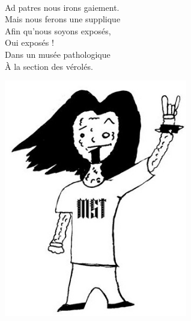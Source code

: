 \\Ad patres nous irons gaiement.
\\Mais nous ferons une supplique
\\Afin qu'nous soyons exposés,
\\Oui exposés !
\\Dans un musée pathologique
\\À la section des vérolés. ~~~~~~~~~~~~~~~~~~\bissimple
\\
\begin{center}
\includegraphics[width=0.6\textwidth]{images/unis_veroles.jpg}
\end{center}

\breakpage
